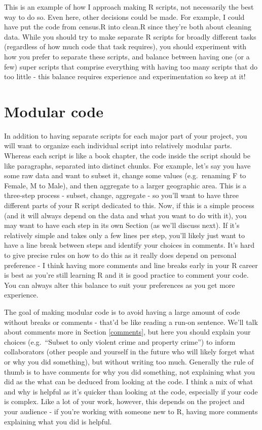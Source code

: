 \documentclass[
]{krantz}
\begin{document}
This is an example of how I approach making R scripts, not
necessarily the best way to do so. Even here, other
decisions could be made. For example, I could have put the
code from census.R into clean.R since they're both about
cleaning data. While you should try to make separate R
scripts for broadly different tasks (regardless of how much
code that task requires), you should experiment with how you
prefer to separate these scripts, and balance between having
one (or a few) super scripts that comprise everything with
having too many scripts that do too little - this balance
requires experience and experimentation so keep at it!

\hypertarget{modular-code}{%
\section{Modular code}\label{modular-code}}

In addition to having separate scripts for each major part
of your project, you will want to organize each individual
script into relatively modular parts. Whereas each script is
like a book chapter, the code inside the script should be
like paragraphs, separated into distinct chunks. For
example, let's say you have some raw data and want to subset
it, change some values (e.g.~renaming F to Female, M to
Male), and then aggregate to a larger geographic area. This
is a three-step process - subset, change, aggregate - so
you'll want to have three different parts of your R script
dedicated to this. Now, if this is a simple process (and it
will always depend on the data and what you want to do with
it), you may want to have each step in its own Section (as
we'll discuss next). If it's relatively simple and takes
only a few lines per step, you'll likely just want to have a
line break between steps and identify your choices in
comments. It's hard to give precise rules on how to do this
as it really does depend on personal preference - I think
having more comments and line breaks early in your R career
is best as you're still learning R and it is good practice
to comment your code. You can always alter this balance to
suit your preferences as you get more experience.

The goal of making modular code is to avoid having a large
amount of code without breaks or comments - that'd be like
reading a run-on sentence. We'll talk about comments more in
Section \ref{comments}, but here you should explain your
choices (e.g.~``Subset to only violent crime and property
crime'') to inform collaborators (other people and yourself
in the future who will likely forget what or why you did
something), but without writing too much. Generally the rule
of thumb is to have comments for why you did something, not
explaining what you did as the what can be deduced from
looking at the code. I think a mix of what and why is
helpful as it's quicker than looking at the code, especially
if your code is complex. Like a lot of your work, however,
this depends on the project and your audience - if you're
working with someone new to R, having more comments
explaining what you did is helpful.
\end{document}
